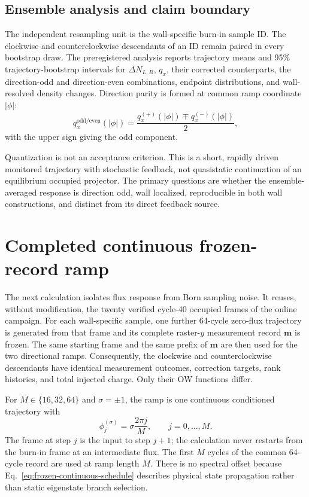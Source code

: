 \documentclass[aps,prb,twocolumn,floatfix,nofootinbib,superscriptaddress]{revtex4-2}
\begin{document}
\subsection{Ensemble analysis and claim boundary}

The independent resampling unit is the wall-specific burn-in sample ID.  The
clockwise and counterclockwise descendants of an ID remain paired in every
bootstrap draw.  The preregistered analysis reports trajectory means and 95\%
trajectory-bootstrap intervals for $\Delta N_{L,R}$, $q_x$, their corrected
counterparts, the direction-odd and direction-even combinations, endpoint
distributions, and wall-resolved density changes.  Direction parity is formed
at common ramp coordinate $|\phi|$:
\begin{equation}
  q_x^{\mathrm{odd/even}}(|\phi|)=
  \frac{q_x^{(+)}(|\phi|)\mp q_x^{(-)}(|\phi|)}{2},
\end{equation}
with the upper sign giving the odd component.

Quantization is not an acceptance criterion.  This is a short, rapidly driven
monitored trajectory with stochastic feedback, not quasistatic continuation
of an equilibrium occupied projector.  The primary questions are whether the
ensemble-averaged response is direction odd, wall localized, reproducible in
both wall constructions, and distinct from its direct feedback source.

\section{Completed continuous frozen-record ramp}

The next calculation isolates flux response from Born sampling noise.  It
reuses, without modification, the twenty verified cycle-40 occupied frames of
the online campaign.  For each wall-specific sample, one further 64-cycle
zero-flux trajectory is generated from that frame and its complete raster-$y$
measurement record $\boldsymbol m$ is frozen.  The same starting frame and the
same prefix of $\boldsymbol m$ are then used for the two directional ramps.
Consequently, the clockwise and counterclockwise descendants have identical
measurement outcomes, correction targets, rank histories, and total injected
charge.  Only their OW functions differ.

For $M\in\{16,32,64\}$ and $\sigma=\pm1$, the ramp is one continuous
conditioned trajectory with
\begin{equation}
  \phi_j^{(\sigma)}=\sigma\frac{2\pi j}{M},
  \qquad j=0,\ldots,M.
  \label{eq:frozen-continuous-schedule}
\end{equation}
The frame at step $j$ is the input to step $j+1$; the calculation never
restarts from the burn-in frame at an intermediate flux.  The first $M$
cycles of the common 64-cycle record are used at ramp length $M$.  There is no
spectral offset because Eq.~\eqref{eq:frozen-continuous-schedule} describes
physical state propagation rather than static eigenstate branch selection.
\end{document}
